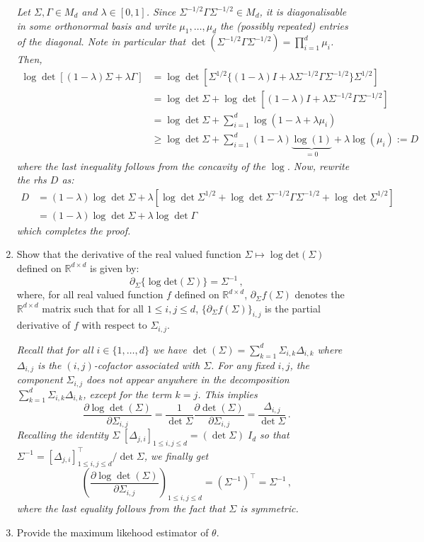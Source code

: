 \documentclass[a4paper,10pt,fleqn]{article}
\newcommand{\eqsp}{\,}
\newcommand{\rset}{\ensuremath{\mathbb{R}}}
\newcommand{\1}{\ensuremath{\mathbbm{1}}}
\begin{document}
\begin{enumerate}
{\em
Let $\Sigma,\Gamma \in M_d$ and $\lambda \in [0,1]$.  Since $\Sigma^{-1/2}\Gamma\Sigma^{-1/2} \in M_d$, it is diagonalisable in some orthonormal basis and write $\mu_1,\ldots, \mu_d$ the (possibly repeated) entries of the diagonal. Note in particular that $\det (\Sigma^{-1/2}\Gamma\Sigma^{-1/2})=\prod_{i=1}^d \mu_i$. Then,
\begin{align*}
\log \det [(1-\lambda)\Sigma+\lambda \Gamma]&=\log \det [\Sigma^{1/2} \{(1-\lambda)I+\lambda \Sigma^{-1/2}\Gamma\Sigma^{-1/2}\} \Sigma^{1/2}]\\
&=\log \det \Sigma + \log \det [(1-\lambda)I+\lambda \Sigma^{-1/2}\Gamma\Sigma^{-1/2}] \nonumber \\
&=\log \det \Sigma + \sum_{i=1}^d \log(1-\lambda+\lambda \mu_i)\nonumber \\
& \geq \log \det \Sigma + \sum_{i=1}^d (1-\lambda) \underbrace{\log(1)}_{=0}+\lambda \log( \mu_i) \label{eq:diag}:= D
\end{align*}
where the last inequality follows from the concavity of the $\log$. Now, rewrite the rhs $D$ as:
\begin{align*}
D&=(1-\lambda) \log \det \Sigma + \lambda [\log \det \Sigma^{1/2}+ \log \det \Sigma^{-1/2}\Gamma\Sigma^{-1/2} + \log \det \Sigma^{1/2}] \\
&=(1-\lambda) \log \det \Sigma + \lambda \log \det \Gamma
\end{align*}
which completes the proof.
}
\item  Show that the derivative of the real valued function $\Sigma \mapsto \log\mathrm{det}(\Sigma)$ defined on $\rset^{d\times d}$ is given by:
$$
\partial_{\Sigma}\{\log\mathrm{det}(\Sigma)\}= \Sigma^{-1}\eqsp,
$$
where, for all real valued function $f$ defined on $\rset^{d\times d}$, $\partial_{\Sigma}f(\Sigma)$ denotes the $\rset^{d\times d}$ matrix such that for all $1\leqslant i,j\leqslant d$, $\{\partial_{\Sigma}f(\Sigma)\}_{i,j}$ is the partial derivative of $f$ with respect to $\Sigma_{i,j}$.

\vspace{.2cm}

{\em
Recall that for all $i \in \{1,\ldots,d\}$ we have
      $\det(\Sigma)=\sum_{k=1}^d \Sigma_{i,k} \Delta_{i,k}$ where
      $\Delta_{i,j}$ is the $(i,j)$-cofactor associated with
      $\Sigma$. For any fixed $i,j$, the component $\Sigma_{i,j}$ does not appear  anywhere in
      the decomposition $\sum_{k=1}^d \Sigma_{i,k} \Delta_{i,k}$,
      except for the term $k=j$. This implies
      $$
      \frac{\partial \log \det(\Sigma)}{\partial \Sigma_{i,j}}=
      \frac{1}{\det \Sigma}\frac{\partial  \det(\Sigma)}{\partial
        \Sigma_{i,j}}=\frac{\Delta_{i,j}}{\det  \Sigma}\,.
      $$
      Recalling the identity $\Sigma\; [\Delta_{j,i}]_{1\leq i,j \leq d}=(\det
      \Sigma)\; I_d$ so that $\Sigma^{-1}=[\Delta_{j,i}]_{1\leq i,j \leq d}^\top/\det
      \Sigma$, we finally get
      $$
(\frac{\partial \log \det(\Sigma)}{\partial \Sigma_{i,j}})_{1\leq
  i,j  \leq d}=(\Sigma^{-1})^\top=\Sigma^{-1}\,,
$$
where the last equality follows from the fact that $\Sigma$ is
symmetric.
}
\item Provide the maximum likehood estimator of $\theta$.


\end{enumerate}
\end{document}
